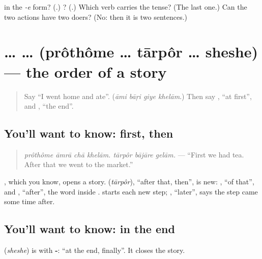 \begin{tcolorbox}[breakable,colback=teal!4,colframe=teal!35!black,title={Before you move on}]
\textbf{} in the \emph{-e} form? (\textbf{}.) \textbf{}? (\textbf{}.) Which verb carries the tense? (The last one.) Can the two actions have two doers? (No: then it is two sentences.)
\end{tcolorbox}
\section[\texorpdfstring{\bn{প্রথমে} … \bn{তারপর} … … (prôthôme … …)}{প্রথমে … তারপর … … (prôthôme … …)}]{ …  …  (prôthôme … tārpôr … sheshe) — the order of a story}

\label{lesson:BN-C267-prothome-tarpor}



\begin{quote}
Say \textquotedblleft{}I went home and ate\textquotedblright{}. (\emph{āmi bāṛi giye khelām}.) Then say \textbf{}, \textquotedblleft{}at first\textquotedblright{}, and \textbf{}, \textquotedblleft{}the end\textquotedblright{}.
\end{quote}

\subsection*{You'll want to know: first, then}
\begin{quote}
\textbf{      }
\end{quote}

\begin{quote}
\emph{prôthôme āmrā chā khelām. tārpôr bājāre gelām.} — \textquotedblleft{}First we had tea. After that we went to the market.\textquotedblright{}
\end{quote}

\textbf{}, which you know, opens a story. \textbf{} (\emph{tārpôr}), \textquotedblleft{}after that, then\textquotedblright{}, is new: \textbf{}, \textquotedblleft{}of that\textquotedblright{}, and \textbf{}, \textquotedblleft{}after\textquotedblright{}, the word inside \textbf{}. \textbf{} starts each new step; \textbf{}, \textquotedblleft{}later\textquotedblright{}, says the step came some time after.

\subsection*{You'll want to know: in the end}
\textbf{} (\emph{sheshe}) is \textbf{} with \textbf{-}: \textquotedblleft{}at the end, finally\textquotedblright{}. It closes the story.

